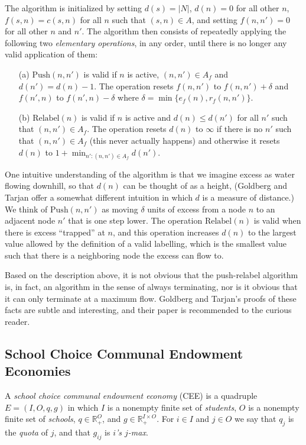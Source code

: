 \documentclass[12pt]{article}
\theoremstyle{definition}
\renewcommand{\Re}{\mathbb{R}}
\begin{document}
\begin{appendix}
The algorithm is initialized by setting $d(s) = |N|$, $d(n) = 0$ for
all other $n$, $f(s,n) = c(s,n)$ for all $n$ such that $(s,n) \in A$,
and setting $f(n,n') = 0$ for all other $n$ and $n'$.  The algorithm
then consists of repeatedly applying the following two
\emph{elementary operations}, in any order, until there is no longer
any valid application of them:
\begin{enumerate}
  \item[(a)] $\mathrm{Push}(n,n')$ is valid if $n$ is active, $(n,n')
    \in A_f$ and $d(n') = d(n) - 1$.  The operation resets $f(n,n')$
    to $f(n,n') + \delta$ and $f(n',n)$ to $f(n',n) - \delta$ where
    $\delta = \min\{e_f(n),r_f(n,n')\}$.
  \item[(b)] $\mathrm{Relabel}(n)$ is valid if $n$ is active and $d(n)
    \le d(n')$ for all $n'$ such that $(n,n') \in A_f$.  The operation
    resets $d(n)$ to $\infty$ if there is no $n'$ such that $(n,n')
    \in A_f$ (this never actually happens) and otherwise it resets
    $d(n)$ to $1 + \min_{n' : (n,n') \in A_f} d(n')$.
\end{enumerate}
One intuitive understanding of the algorithm is that we imagine excess
as water flowing downhill, so that $d(n)$ can be thought of as a
height, (Goldberg and Tarjan offer a somewhat different intuition in
which $d$ is a measure of distance.) We think of $\mathrm{Push}(n,n')$
as moving $\delta$ units of excess from a node $n$ to an adjacent node
$n'$ that is one step lower.  The operation $\mathrm{Relabel}(n)$ is
valid when there is excess ``trapped'' at $n$, and this operation
increases $d(n)$ to the largest value allowed by the definition of a
valid labelling, which is the smallest value such that there is a
neighboring node the excess can flow to.

Based on the description above, it is not obvious that the
push-relabel algorithm is, in fact, an algorithm in the sense of
always terminating, nor is it obvious that it can only terminate at a
maximum flow.  Goldberg and Tarjan's proofs of these facts are subtle
and interesting, and their paper is recommended to the curious reader.

\subsection{School Choice Communal Endowment Economies}

A \emph{school choice communal endowment economy} (CEE) is a quadruple
$E = (I,O,q,g)$ in which $I$ is a nonempty finite set of
\emph{students}, $O$ is a nonempty finite set of \emph{schools}, $q
\in \Re_+^O$, and $g \in \Re_+^{I \times O}$.  For $i \in I$ and $j
\in O$ we say that $q_j$ is the \emph{quota} of $j$, and that $g_{ij}$
is \emph{$i$'s $j$-max}.


\end{appendix}
\end{document}
